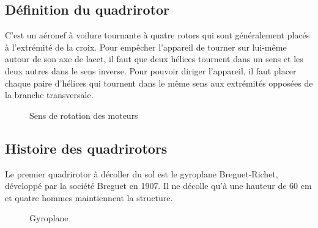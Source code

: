 \subsection{Définition du quadrirotor}
C'est un aéronef à voilure tournante à quatre rotors qui sont généralement placés à l'extrémité de la croix. Pour empêcher l'appareil de tourner sur lui-même autour de son axe de lacet, il faut que deux hélices tournent dans un sens et les deux autres dans le sens inverse\cite{Wikipidea}. Pour pouvoir diriger l'appareil, il faut placer chaque paire d'hélices qui tournent dans le même sens aux extrémités opposées de la branche transversale.
	\begin{figure}[H] 
	\begin{center} 
		\centering
{}	
	\end{center}
	\caption{Sens de rotation des moteurs }
	\end{figure}
	\subsection{Histoire des quadrirotors}
	Le premier quadrirotor à décoller du sol est le gyroplane Breguet-Richet, développé par la société Breguet en 1907. Il ne décolle qu'à une hauteur de 60 cm et quatre hommes maintiennent la structure\cite{Wikipidea}. 
	\begin{figure}[H] 
	\begin{center} 
		\centering
		
	\end{center}
	\caption{Gyroplane }
	\end{figure}

